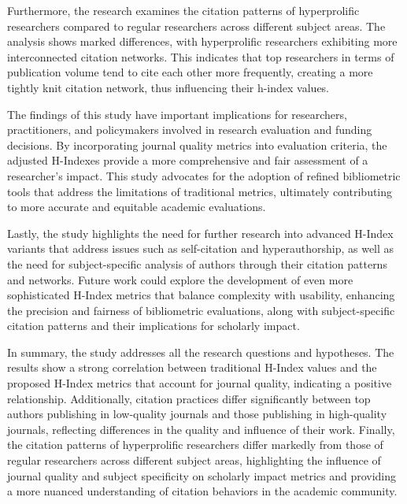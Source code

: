 Furthermore, the research examines the citation patterns of hyperprolific
researchers compared to regular researchers across different subject areas. The
analysis shows marked differences, with hyperprolific researchers exhibiting
more interconnected citation networks. This indicates that top researchers in
terms of publication volume tend to cite each other more frequently, creating a
more tightly knit citation network, thus influencing their h-index values.

The findings of this study have important implications for researchers,
practitioners, and policymakers involved in research evaluation and funding
decisions. By incorporating journal quality metrics into evaluation criteria,
the adjusted H-Indexes provide a more comprehensive and fair assessment of a
researcher’s impact. This study advocates for the adoption of refined
bibliometric tools that address the limitations of traditional metrics,
ultimately contributing to more accurate and equitable academic evaluations.

Lastly, the study highlights the need for further research into advanced
H-Index variants that address issues such as self-citation and hyperauthorship,
as well as the need for subject-specific analysis of authors through their
citation patterns and networks. Future work could explore the development of
even more sophisticated H-Index metrics that balance complexity with usability,
enhancing the precision and fairness of bibliometric evaluations, along with
subject-specific citation patterns and their implications for scholarly impact.

In summary, the study addresses all the research questions and hypotheses. The
results show a strong correlation between traditional H-Index values and the
proposed H-Index metrics that account for journal quality, indicating a
positive relationship. Additionally, citation practices differ significantly
between top authors publishing in low-quality journals and those publishing in
high-quality journals, reflecting differences in the quality and influence of
their work. Finally, the citation patterns of hyperprolific researchers differ
markedly from those of regular researchers across different subject areas,
highlighting the influence of journal quality and subject specificity on
scholarly impact metrics and providing a more nuanced understanding of citation
behaviors in the academic community.


